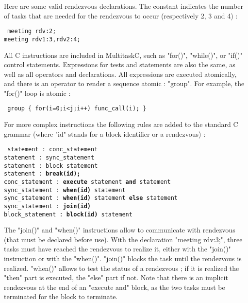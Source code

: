 \documentclass[10pt]{report}
\begin{document}
Here are some valid rendezvous declarations. The constant indicates the number of tasks that are needed for the rendezvous to
occur (respectively 2, 3 and 4) :

\begin{table}[h!]
\tt
\footnotesize
meeting rdv:2;\\
meeting rdv1:3,rdv2:4;\\
\end{table}

All C instructions are included in MultitaskC, such as "for()", "while()", or "if()" control statements. Expressions for
tests and statements are also the same, as well as all operators and declarations. All expressions are executed atomically, and
there is an operator to render a sequence atomic : "group". For example, the "for()" loop is atomic :

\begin{table}[h!]
\tt
\footnotesize
group \{ for(i=0;i<j;i++) func\_call(i); \}
\end{table}

For more complex instructions the following rules are added to the standard C grammar (where "id" stands for a block
identifier or a rendezvous) :

\begin{table}[h!]
\tt
\footnotesize
statement : conc\_statement\\
statement : sync\_statement\\
statement : block\_statement\\
statement : {\bf break(id);}\\
conc\_statement : {\bf execute} statement {\bf and} statement\\
sync\_statement : {\bf when(id)} statement\\
sync\_statement : {\bf when(id)} statement {\bf else} statement\\
sync\_statement : {\bf join(id)}\\
block\_statement : {\bf block(id)} statement\\
\end{table}

The "join()" and "when()" instructions allow to communicate with rendezvous (that must be declared before use).
With the declaration "meeting rdv:3;", three tasks must have reached the rendezvous to realize it, either with
the "join()" instruction or with the "when()". "join()" blocks the task until the rendezvous is realized. 
"when()" allows to test the status of a rendezvous ; if it is realized the "then" part is executed, the "else" part
if not. Note that there is an implicit rendezvous at the end of an "execute and" block, as the two tasks must
be terminated for the block to terminate.
\end{document}
